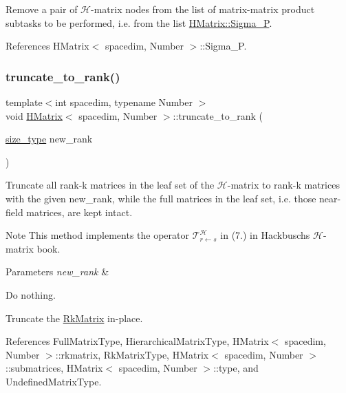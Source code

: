 Remove a pair of $\mathcal{H}$-\/matrix nodes from the list of matrix-\/matrix product subtasks to be performed, i.\+e. from the list {\ttfamily \hyperlink{classHMatrix_a3d96d0252ef8c873ae06cf87874acaf3}{H\+Matrix\+::\+Sigma\+\_\+P}}. 

References H\+Matrix$<$ spacedim, Number $>$\+::\+Sigma\+\_\+P.

\mbox{\label{classHMatrix_a64be687cacd167efc12b892aa154dcd3}} 
\subsubsection{\texorpdfstring{truncate\+\_\+to\+\_\+rank()}{truncate\_to\_rank()}}
{\footnotesize\ttfamily template$<$int spacedim, typename Number $>$ \\
void \hyperlink{classHMatrix}{H\+Matrix}$<$ spacedim, Number $>$\+::truncate\+\_\+to\+\_\+rank (\begin{DoxyParamCaption}\item[{\hyperlink{classHMatrix_a5ca8dc549783d38371a01ecd621ecb34}{size\+\_\+type}}]{new\+\_\+rank }\end{DoxyParamCaption})}

Truncate all rank-\/k matrices in the leaf set of the $\mathcal{H}$-\/matrix to rank-\/k matrices with the given {\ttfamily new\+\_\+rank}, while the full matrices in the leaf set, i.\+e. those near-\/field matrices, are kept intact.


\begin{DoxyDescription}
\item[Note ]This method implements the operator $\mathcal{T}_{r \leftarrow s}^{\mathcal{H}}$ in (7.) in Hackbusch\textquotesingle{}s $\mathcal{H}$-\/matrix book. 
\end{DoxyDescription}
\begin{DoxyParams}{Parameters}
{\em new\+\_\+rank} & \\
\hline
\end{DoxyParams}
Do nothing.

Truncate the \hyperlink{classRkMatrix}{Rk\+Matrix} in-\/place.

References Full\+Matrix\+Type, Hierarchical\+Matrix\+Type, H\+Matrix$<$ spacedim, Number $>$\+::rkmatrix, Rk\+Matrix\+Type, H\+Matrix$<$ spacedim, Number $>$\+::submatrices, H\+Matrix$<$ spacedim, Number $>$\+::type, and Undefined\+Matrix\+Type.



